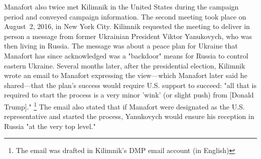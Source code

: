 Manafort also twice met Kilimnik in the United States during the campaign period and conveyed campaign information.
The second meeting took place on August~2, 2016, in New York City.
Kilimnik requested the meeting to deliver in person a message from former Ukrainian President Viktor Yanukovych, who was then living in Russia.
The message was about a peace plan for Ukraine that Manafort has since acknowledged was a "backdoor" means for Russia to control eastern Ukraine.
Several months later, after the presidential election, Kilimnik wrote an email to Manafort expressing the view---which Manafort later said he shared---that the plan's success would require U.S. support to succeed: "all that is required to start the process is a very minor 'wink' (or slight push) from [Donald Trump]."%
\footnote{The email was drafted in Kilimnik's DMP email account (in English) }
The email also stated that if Manafort were designated as the U.S. representative and started the process, Yanukovych would ensure his reception in Russia "at the very top level."

